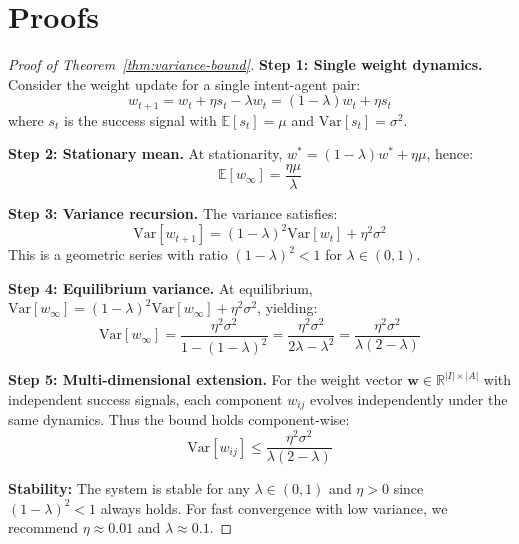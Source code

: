 \documentclass[11pt,a4paper]{article}
\theoremstyle{definition}
\theoremstyle{remark}
\begin{document}
\section{Proofs}
\label{sec:proofs}

\begin{proof}[Proof of Theorem~\ref{thm:variance-bound}]

\textbf{Step 1: Single weight dynamics.}
Consider the weight update for a single intent-agent pair:
\[
w_{t+1} = w_t + \eta s_t - \lambda w_t = (1-\lambda)w_t + \eta s_t
\]
where $s_t$ is the success signal with $\mathbb{E}[s_t] = \mu$ and $\text{Var}[s_t] = \sigma^2$.

\textbf{Step 2: Stationary mean.}
At stationarity, $w^* = (1-\lambda)w^* + \eta\mu$, hence:
\[
\mathbb{E}[w_\infty] = \frac{\eta \mu}{\lambda}
\]

\textbf{Step 3: Variance recursion.}
The variance satisfies:
\[
\text{Var}[w_{t+1}] = (1-\lambda)^2 \text{Var}[w_t] + \eta^2 \sigma^2
\]
This is a geometric series with ratio $(1-\lambda)^2 < 1$ for $\lambda \in (0,1)$.

\textbf{Step 4: Equilibrium variance.}
At equilibrium, $\text{Var}[w_\infty] = (1-\lambda)^2 \text{Var}[w_\infty] + \eta^2\sigma^2$, yielding:
\[
\text{Var}[w_\infty] = \frac{\eta^2 \sigma^2}{1-(1-\lambda)^2} = \frac{\eta^2 \sigma^2}{2\lambda - \lambda^2} = \frac{\eta^2 \sigma^2}{\lambda(2-\lambda)}
\]

\textbf{Step 5: Multi-dimensional extension.}
For the weight vector $\mathbf{w} \in \mathbb{R}^{|I| \times |A|}$ with independent success signals, each component $w_{ij}$ evolves independently under the same dynamics. Thus the bound holds component-wise:
\[
\text{Var}[w_{ij}] \leq \frac{\eta^2 \sigma^2}{\lambda(2-\lambda)}
\]

\textbf{Stability:} The system is stable for any $\lambda \in (0,1)$ and $\eta > 0$ since $(1-\lambda)^2 < 1$ always holds. For fast convergence with low variance, we recommend $\eta \approx 0.01$ and $\lambda \approx 0.1$.
\end{proof}
\end{document}
